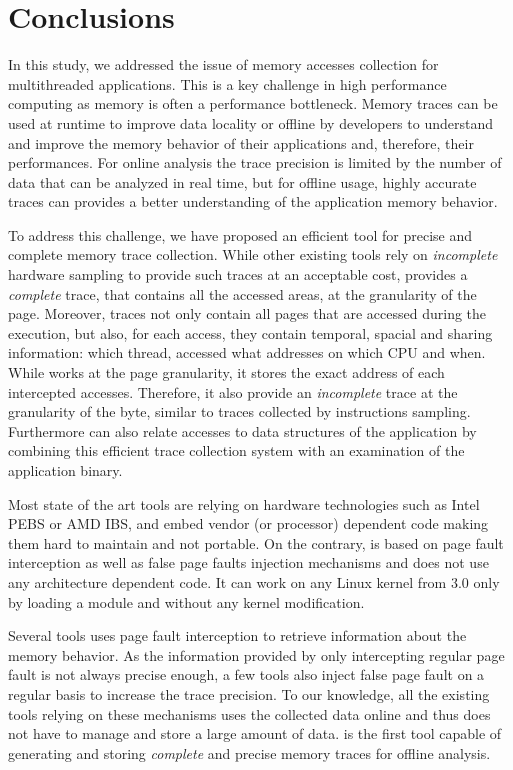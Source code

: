 \section{Conclusions}
\label{sec:cncl}

In this study, we addressed the issue of memory accesses collection for
multithreaded applications. This is a key challenge in high performance
computing as memory is often a performance
bottleneck. Memory traces can be used at runtime to improve data locality or
offline by developers to understand and improve the memory
behavior of their applications and, therefore, their performances. For online analysis the trace precision
is limited by the number of data that can be analyzed in real time, but for
offline usage, highly accurate traces can provides a better understanding of
the application memory behavior.

To address this challenge, we have proposed \Moca an efficient tool for precise
and complete memory trace collection. While other existing tools
rely on \emph{incomplete} hardware sampling to
provide such traces at an acceptable cost, \Moca provides a \emph{complete}
trace, that contains all the accessed areas, at the granularity of the page.
Moreover, \Moca traces not only
contain all pages that are accessed during the execution, but also, 
for each access, they contain temporal, spacial and sharing
information: which thread, accessed what addresses on which CPU and when.
While \Moca works at the page granularity, it stores the exact
address of each intercepted accesses. Therefore, it also provide an
\emph{incomplete} trace at the granularity of the byte, similar to
traces collected by instructions sampling. Furthermore \Moca can also relate accesses to
data structures of the application by combining this efficient trace collection system with an examination
of the application binary.

Most state of the art tools are relying on hardware technologies such as Intel PEBS
or AMD IBS, and embed vendor (or processor) dependent code making them hard
to maintain and not portable. On the contrary, \Moca is based on page
fault interception as well as false page faults injection mechanisms and does not use any architecture dependent code.
It can work on any Linux kernel from $3.0$ only by loading a module and
without any kernel modification.

Several tools uses page fault interception to retrieve information about the memory
behavior. As the information provided by only intercepting regular page fault
is not always precise enough, a few tools also inject false page fault
on a regular basis to increase the trace precision. To our knowledge, all the
existing tools relying on these mechanisms uses the collected data online and
thus does not have to manage and store a large amount of data. \Moca is the
first tool capable of generating and storing \emph{complete} and precise memory traces for offline
analysis.

